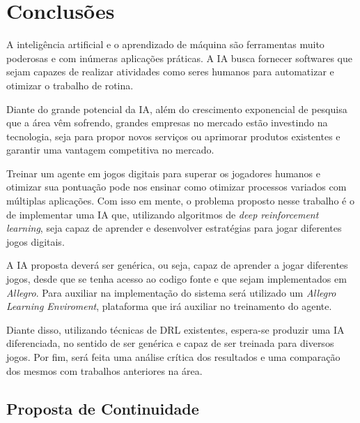 \chapter{Conclusões}
\label{chap:conclusoes}

A inteligência artificial e o aprendizado de máquina são ferramentas muito poderosas e com inúmeras aplicações práticas. A IA busca fornecer softwares que sejam capazes de realizar atividades como seres humanos para automatizar e otimizar o trabalho de rotina. 

Diante do grande potencial da IA, além do crescimento exponencial de pesquisa que a área vêm sofrendo, grandes empresas no mercado estão investindo na tecnologia, seja para propor novos serviços ou aprimorar produtos existentes e garantir uma vantagem competitiva no mercado.


Treinar um agente em jogos digitais para superar os jogadores humanos e otimizar sua pontuação pode nos ensinar como otimizar processos variados com múltiplas aplicações. Com isso em mente, o problema proposto nesse trabalho é o de implementar uma IA que, utilizando algoritmos de \textit{deep reinforcement learning}, seja capaz de aprender e desenvolver estratégias para jogar diferentes jogos digitais. 

A IA proposta deverá ser genérica, ou seja, capaz de aprender a jogar diferentes jogos, desde que se tenha acesso ao codigo fonte e que sejam implementados em \textit{Allegro}. Para auxiliar na implementação do sistema será utilizado um \textit{Allegro Learning Enviroment}, plataforma que irá auxiliar no treinamento do agente. 

Diante disso, utilizando técnicas de DRL existentes, espera-se produzir uma IA diferenciada, no sentido de ser genérica e capaz de ser treinada para diversos jogos. Por fim, será feita uma análise crítica dos resultados e uma comparação dos mesmos com trabalhos anteriores na área.

\section{Proposta de Continuidade} %
\label{sec:proposta_de_continuidade}

